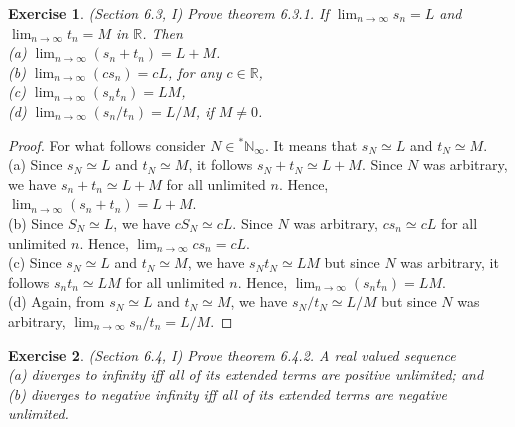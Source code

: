 \documentclass[a4paper, 11pt]{book}
\theoremstyle{plain}
\newtheorem{exercise}{Exercise}[chapter]
\theoremstyle{plain}
\newcommand{\arr}{\rightarrow}
\newcommand{\N}{\mathbb{N}}
\newcommand{\R}{\mathbb{R}}
\newcommand{\hyp}{{}^*}
\begin{document}
  \begin{exercise}
    (Section 6.3, I)
    Prove theorem 6.3.1. If $\lim_{n \arr \infty }s_n=L$ and $\lim_{n \arr \infty} t_n=M$ in $\R$. Then \\
    (a) $\lim_{n\arr \infty} (s_n+t_n)=L+M$. \\
    (b) $\lim_{n \arr \infty} (cs_n)=cL$, for any $c \in \R$, \\
    (c) $\lim_{n \arr \infty} (s_n t_n)=LM$, \\
    (d) $\lim_{n \arr \infty} (s_n/t_n)=L/M$, if $M \not = 0$.
  \end{exercise}
  \begin{proof} For what follows consider $N \in \hyp \N_{\infty}$. It means that $s_N \simeq L$ and $t_N \simeq M$.\\
    (a) Since $s_N \simeq L$ and $t_N \simeq M$, it follows $s_N+t_N \simeq L+M$. Since $N$ was arbitrary, we have $s_n+t_n \simeq L+M$ for all unlimited $n$. Hence, $\lim_{n \arr \infty } (s_n+t_n)=L+M$. \\
    (b) Since $S_N \simeq L$, we have $c S_N \simeq cL$. Since $N$ was arbitrary, $cs_n \simeq cL$ for all unlimited $n$. Hence, $\lim_{n \arr \infty } cs_n=cL$. \\
    (c) Since $s_N \simeq L$ and $t_N \simeq M$, we have $s_N t_N \simeq LM$ but since $N$ was arbitrary, it follows $s_nt_n \simeq LM$ for all unlimited $n$. Hence, $\lim_{n \arr \infty} (s_n t_n)=LM$. \\
    (d) Again, from $s_N \simeq L$ and $t_N \simeq M$, we have $s_N/t_N \simeq L/M$ but since $N$ was arbitrary, $\lim_{n \arr \infty } s_n/t_n=L/M$.
  \end{proof}
  \begin{exercise}
    (Section 6.4, I)
    Prove theorem 6.4.2. A real valued sequence \\
    (a) diverges to infinity iff all of its extended terms are positive unlimited; and \\
    (b) diverges to negative infinity iff all of its extended terms are negative unlimited.
  \end{exercise}
\end{document}
